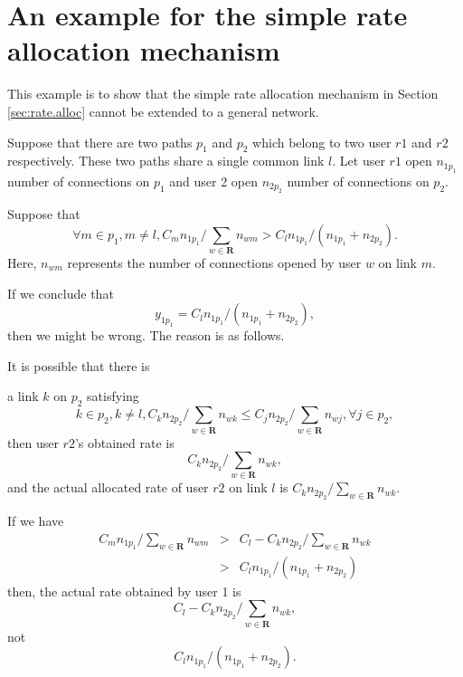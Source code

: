 \documentclass[conference]{IEEEtran}
\begin{document}


%



\appendices

\bigskip
\section{An example for the simple rate allocation mechanism}\label{appd:simple}

This example is to show that the simple rate allocation mechanism
in Section \ref{sec:rate.alloc} cannot be extended to a general
network.

Suppose that there are two paths $p_1$ and $p_2$ which belong to
two user $r1$ and $r2$ respectively. These two paths share a
single common link $l$. Let user $r1$ open $n_{1p_1}$ number of
connections on $p_1$ and user 2 open $n_{2p_2}$ number of
connections on $p_2$.

Suppose that
$$\forall m\in p_1 , m\ne l,
C_m n_{1p_1}/\sum_{w\in \mathbf{R}} n_{wm} > C_l
n_{1p_1}/(n_{1p_1}+n_{2p_2}).$$
Here, $n_{wm}$ represents the number of connections opened by user
$w$ on link $m$.

If we conclude that
$$y_{1p_1}=C_l n_{1p_1}/(n_{1p_1}+n_{2p_2}),$$ then we might be wrong.
The reason is as follows.

It is possible that there is
\begin{comment}
$$
\forall m\in p_2, m\ne l,
 C_k n^2/\sum_{w\in \mathbf{R}} n^w_k < C_l
n^2/\sum_{w\in \mathbf{R}} n^w_l.
$$
\end{comment}
a link $k$ on $p_2$ satisfying
$$
 k\in p_2, k\ne l,
 C_k n_{2p_2}/\sum_{w\in \mathbf{R}} n_{wk} \le C_j
n_{2p_2}/\sum_{w\in \mathbf{R}} n_{wj}, \forall j\in p_2,
$$
then user $r2$'s obtained rate is
$$
C_k n_{2p_2}/\sum_{w\in \mathbf{R}} n_{wk},
$$
and the actual allocated rate of user $r2$ on link $l$ is $C_k
n_{2p_2}/\sum_{w\in \mathbf{R}} n_{wk}$.

If we have
\begin{eqnarray}
C_m n_{1p_1}/\sum_{w\in \mathbf{R}} n_{wm} &>& C_l - C_k
n_{2p_2}/\sum_{w\in \mathbf{R}}n_{wk} \nonumber \\
&>& C_l n_{1p_1}/(n_{1p_1}+n_{2p_2}) \nonumber
\end{eqnarray}
then, the actual rate obtained by user 1 is
$$
C_l - C_k n_{2p_2}/\sum_{w\in \mathbf{R}} n_{wk},
$$
not $$C_l n_{1p_1}/(n_{1p_1}+n_{2p_2}).$$
\end{document}
